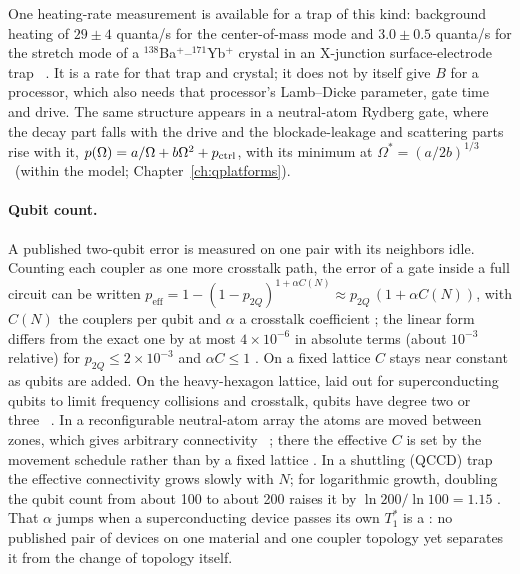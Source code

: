 \noindent One heating-rate measurement is available for a trap of this kind: background heating of $29\pm4$ quanta/s for the center-of-mass mode and
$3.0\pm0.5$ quanta/s for the stretch mode of a $^{138}$Ba$^+$--$^{171}$Yb$^+$ crystal in an X-junction surface-electrode trap~\cite{Burton2023}
\observed. It is a rate for that trap and crystal; it does not by itself give $B$ for a processor, which also needs that processor's Lamb--Dicke
parameter, gate time and drive. The same structure appears in a neutral-atom Rydberg gate, where the decay part falls with the drive and the
blockade-leakage and scattering parts rise with it, $p(\Omega)=a/\Omega+b\Omega^2+p_{\rm ctrl}$, with its minimum at $\Omega^*=(a/2b)^{1/3}$
\derived\ (within the model; Chapter~\ref{ch:qplatforms}).

\paragraph{Qubit count.} A published two-qubit error is measured on one pair with its neighbors idle. Counting each coupler as one more
crosstalk path, the error of a gate inside a full circuit can be written $p_{\mathrm{eff}}=1-(1-p_{2Q})^{1+\alpha C(N)}\approx
p_{2Q}\,(1+\alpha C(N))$, with $C(N)$ the couplers per qubit and $\alpha$ a crosstalk coefficient \conjecture; the linear form differs from the exact one
by at most $4\times10^{-6}$ in absolute terms (about $10^{-3}$ relative) for $p_{2Q}\le2\times10^{-3}$ and $\alpha C\le1$ \calc. On a fixed lattice $C$ stays near constant as qubits
are added. On the heavy-hexagon lattice, laid out for superconducting qubits to limit frequency collisions and crosstalk, qubits have degree two
or three~\cite{Chamberland2020PRX} \observed. In a reconfigurable neutral-atom array the atoms are moved between zones, which gives
arbitrary connectivity~\cite{Bluvstein2024} \observed; there the effective $C$ is set by the movement schedule rather than by a fixed
lattice \interp. In a shuttling (QCCD) trap the effective connectivity grows slowly with $N$; for logarithmic growth, doubling the qubit count from
about 100 to about 200 raises it by $\ln200/\ln100=1.15$ \calc. That $\alpha$ jumps when a superconducting device passes its own $T_1^*$ is a
\conjecture: no published pair of devices on one material and one coupler topology yet separates it from the change of topology itself.

